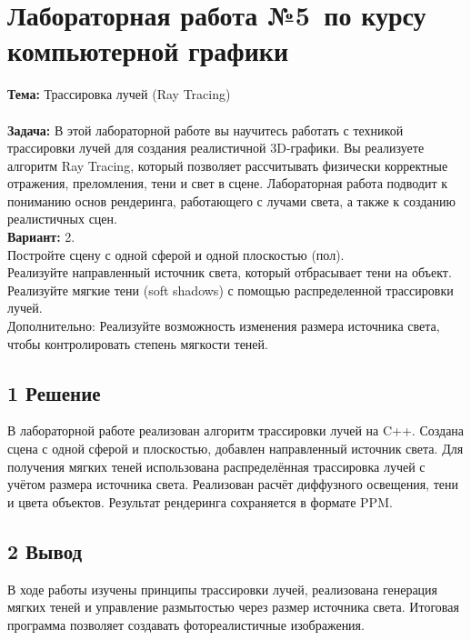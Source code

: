 \documentclass[12pt]{article}
\begin{document}




\section*{Лабораторная работа №5\, по курсу компьютерной графики}

\textbf{Тема:} Трассировка лучей (Ray Tracing)\\
\\
\textbf{Задача:} В этой лабораторной работе вы научитесь работать с техникой трассировки лучей для
создания реалистичной 3D-графики. Вы реализуете алгоритм Ray Tracing, который позволяет
рассчитывать физически корректные отражения, преломления, тени и свет в сцене.
Лабораторная работа подводит к пониманию основ рендеринга, работающего с лучами
света, а также к созданию реалистичных сцен.\\
\textbf{Вариант:} 2. \\
Постройте сцену с одной сферой и одной плоскостью (пол).\\
Реализуйте направленный источник света, который отбрасывает тени на объект.\\
Реализуйте мягкие тени (soft shadows) с помощью распределенной трассировки лучей.\\
Дополнительно: Реализуйте возможность изменения размера источника света, чтобы
контролировать степень мягкости теней.\\

\subsection*{1 Решение}
В лабораторной работе реализован алгоритм трассировки лучей на C++. Создана сцена с одной сферой и плоскостью, добавлен направленный источник света. Для получения мягких теней использована распределённая трассировка лучей с учётом размера источника света. Реализован расчёт диффузного освещения, тени и цвета объектов. Результат рендеринга сохраняется в формате PPM.

\subsection*{2 Вывод}
В ходе работы изучены принципы трассировки лучей, реализована генерация мягких теней и управление размытостью через размер источника света. Итоговая программа позволяет создавать фотореалистичные изображения.
\end{document}
